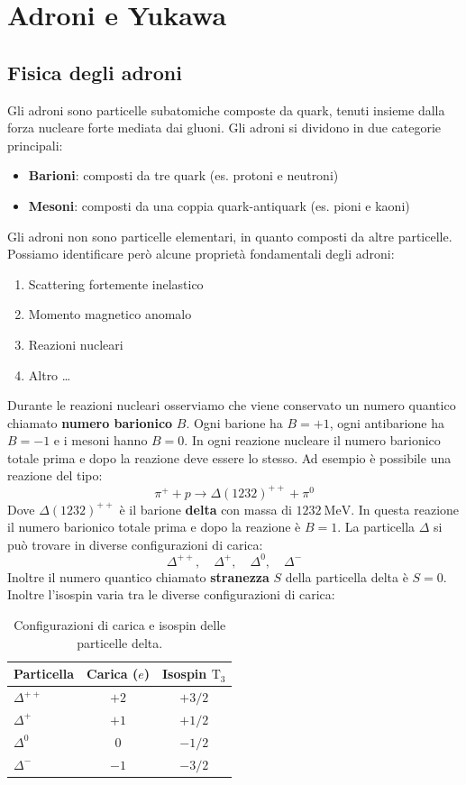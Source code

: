 \chapter{Adroni e Yukawa}
\section{Fisica degli adroni}
Gli adroni sono particelle subatomiche composte da quark, tenuti insieme dalla forza nucleare forte mediata dai gluoni. Gli adroni si dividono in due categorie principali:
\begin{itemize}
    \item \textbf{Barioni}: composti da tre quark (es. protoni e neutroni)
    \item \textbf{Mesoni}: composti da una coppia quark-antiquark (es. pioni e kaoni)
\end{itemize}
Gli adroni non sono particelle elementari, in quanto composti da altre particelle. Possiamo identificare però alcune proprietà fondamentali degli adroni:
\begin{enumerate}
    \item Scattering fortemente inelastico
    \item Momento magnetico anomalo
    \item Reazioni nucleari
    \item Altro \dots
\end{enumerate}
Durante le reazioni nucleari osserviamo che viene conservato un numero quantico chiamato \textbf{numero barionico} $B$. Ogni barione ha $B=+1$, ogni antibarione ha $B=-1$ e i mesoni hanno $B=0$. In ogni reazione nucleare il numero barionico totale prima e dopo la reazione deve essere lo stesso. Ad esempio è possibile una reazione del tipo:
\begin{equation}
  \pi^+ +  p \to \Delta (1232)^{++} + \pi^0
\end{equation}
Dove $\Delta (1232)^{++}$ è il barione \textbf{delta} con massa di $\qty{1232}{\mega\electronvolt}$. In questa reazione il numero barionico totale prima e dopo la reazione è $B=1$. La particella $\Delta$ si può trovare in diverse configurazioni di carica:
\begin{equation}
    \Delta^{++}, \quad \Delta^{+}, \quad \Delta^{0}, \quad \Delta^{-}
\end{equation}
Inoltre il numero quantico chiamato \textbf{stranezza} $S$ della particella delta è $S=0$. Inoltre l'isospin varia tra le diverse configurazioni di carica:
\begin{table}[H]
    \centering
    \begin{tabular}{lcc}
        \hline
        \textbf{Particella} & \textbf{Carica} ($e$) & \textbf{Isospin} $\text{T}_3$ \\
        \hline
        $\Delta^{++}$ & $+2$ & $+3/2$ \\[8pt]
        $\Delta^{+}$ & $+1$ & $+1/2$ \\[8pt]
        $\Delta^{0}$ & $0$ & $-1/2$ \\[8pt]
        $\Delta^{-}$ & $-1$ & $-3/2$\\
        \hline
    \end{tabular}
    \caption{Configurazioni di carica e isospin delle particelle delta.}
\end{table}
